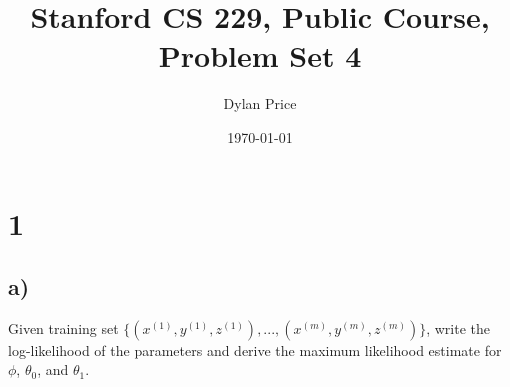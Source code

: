 \documentclass[11pt]{article}
\begin{document}
\title{Stanford CS 229, Public Course, Problem Set 4}
\date{\today}
\author{Dylan Price}
\maketitle 

\newcommand{\xith}[0]{x^{(i)}}
\newcommand{\yith}[0]{y^{(i)}}
\newcommand{\zith}[0]{z^{(i)}}
\newcommand{\sums}[0]{\sum_{s' \in \mathbb{S}}}

\section*{1}

\subsection*{a)}
Given training set $\{(x^{(1)},y^{(1)},z^{(1)}),...,(x^{(m)},y^{(m)},z^{(m)})\}$, write the log-likelihood of the parameters and derive the maximum likelihood estimate for $\phi$, $\theta_0$, and $\theta_1$. \\
\end{document}
